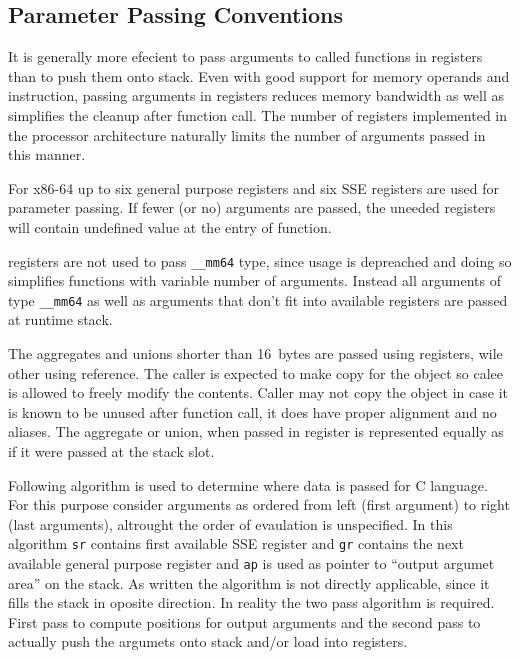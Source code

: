 \subsection{Parameter Passing Conventions}
It is generally more efecient to pass arguments to called functions in
registers than to push them onto stack. Even with good support for memory
operands and  instruction, passing arguments in registers reduces
memory bandwidth as well as simplifies the cleanup after function call.  The
number of registers implemented in the processor architecture naturally limits
the number of arguments passed in this manner.

For x86-64 up to six general purpose registers and six SSE registers are used
for parameter passing.  If fewer (or no) arguments are passed, the uneeded registers
will contain undefined value at the entry of function.

\MMX registers are not used to pass \verb|__mm64| type, since \MMX usage is
depreached and doing so simplifies functions with variable number of arguments.
Instead all arguments of type \verb|__mm64| as well as arguments that don't
fit into available registers are passed at runtime stack.

The aggregates and unions shorter than 16~bytes are passed using registers,
wile other using reference.  The caller is expected to make copy for the object
so calee is allowed to freely modify the contents.  Caller may not copy the
object in case it is known to be unused after function call, it does have
proper alignment and no aliases. The aggregate or union, when passed in register
is represented equally as if it were passed at the stack slot.

Following algorithm is used to determine where data is passed for C language.
For this purpose consider arguments as ordered from left (first argument) to
right (last arguments), altrought the order of evaulation is unspecified. In
this algorithm \verb|sr| contains first available SSE register and \verb|gr|
contains the next available general purpose register and \verb|ap| is used as
pointer to ``output argumet area'' on the stack.  As written the algorithm is
not directly applicable, since it fills the stack in oposite direction. In
reality the two pass algorithm is required.  First pass to compute positions
for output arguments and the second pass to actually push the argumets onto
stack and/or load into registers.

